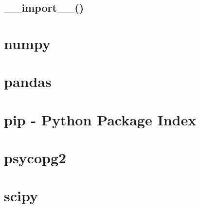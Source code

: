 \documentclass{article}
\begin{document}
\subsection{\_\_import\_\_()}
%

\section{numpy}

\section{pandas}

\section{pip - Python Package Index}


\section{psycopg2}

\section{scipy}

\newpage



\end{document}
